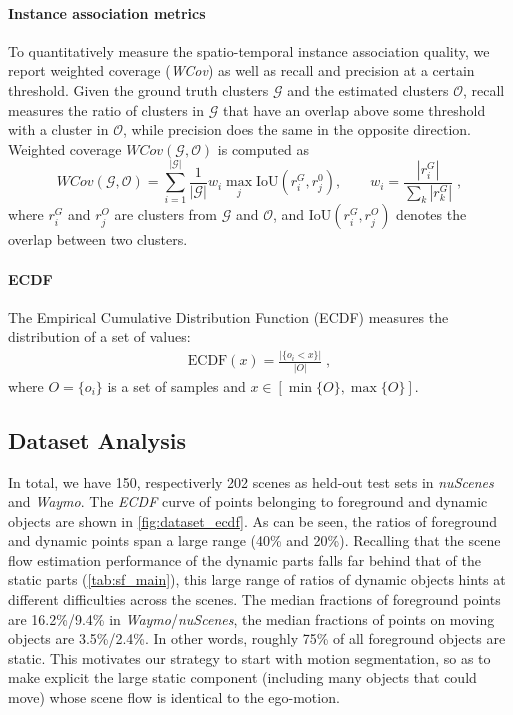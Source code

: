 \paragraph{Instance association metrics}
To quantitatively measure the spatio-temporal instance association quality, we report weighted coverage (\textit{WCov}) as well as recall and precision at a certain threshold. Given the ground truth clusters $\mathcal{G}$ and the estimated clusters $\mathcal{O}$, recall measures the ratio of clusters in $\mathcal{G}$ that have an overlap above some threshold with a cluster in $\mathcal{O}$, while precision does the same in the opposite direction. Weighted coverage $WCov (\mathcal{G},\mathcal{O})$ is computed as
\begin{equation}
    WCov(\mathcal{G}, \mathcal{O}) = \sum_{i=1}^{|\mathcal{G}|} \frac{1}{|\mathcal{G}|} w_i \max_j \mathrm{IoU} (r_i^G, r_j^0), \qquad  w_i = \frac{|r_i^G|}{\sum_k |r_k^G|}\;,
\end{equation}
where $r_i^G$ and $r_j^O$ are clusters from $\mathcal{G}$ and $\mathcal{O}$, and $\mathrm{IoU}(r_i^G, r_j^O)$ denotes the overlap between two clusters. 

\paragraph{ECDF}
The Empirical Cumulative Distribution Function (ECDF) measures the distribution of a set of values:
\begin{equation}
\begin{aligned}
\text{ECDF} (x) = \frac{\big|\{o_i < x\}\big|}{\big|O\big|}\;,
\end{aligned}
\end{equation}
where $O = \{o_i\}$ is a set of samples and $x \in [\min\{O\}, \max\{O\}]$.

\subsection{Dataset Analysis}
\label{sec:supp_dataset}


In total, we have 150, respectiverly 202 scenes as held-out test sets in \emph{nuScenes} and \emph{Waymo}. The \textit{ECDF} curve of points belonging to foreground and dynamic objects are shown in \cref{fig:dataset_ecdf}. As can be seen, the ratios of foreground and dynamic points span a large range (40\% and 20\%). Recalling that the scene flow estimation performance of the dynamic parts falls far behind that of the static parts (\cref{tab:sf_main}), this large range of ratios of dynamic objects hints at different difficulties across the scenes. The median fractions of foreground points are 16.2\%/9.4\% in \emph{Waymo}/\emph{nuScenes}, the median fractions of points on moving objects are 3.5\%/2.4\%. In other words, roughly 75\% of all foreground objects are static. This motivates
our strategy to start with motion segmentation, so as to make explicit the large static component (including many objects that could move) whose scene flow is identical to the ego-motion.

